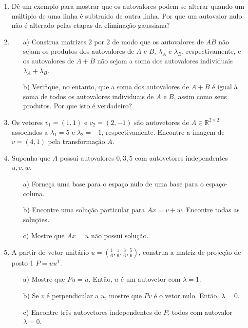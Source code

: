 \documentclass[12pt]{article}
\begin{document}
\begin{enumerate}
\item Dê um exemplo para mostrar que os autovalores podem se alterar quando um múltiplo de uma linha é subtraido de outra linha. Por que um autovalor nulo não é alterado pelas etapas da eliminação gaussiana?

\item
    \begin{itemize}
    \item[a)] Construa matrizes 2 por 2 de modo que os autovalores de $AB$ não sejam os produtos dos autovalores de $A$ e $B$, $\lambda_A$ e $\lambda_B$, respectivamente, e os autovalores de $A+B$ não sejam a soma dos autovalores individuais $\lambda_A+\lambda_B$.
    \item[b)] Verifique, no entanto, que a soma dos autovalores de $A+B$ é igual à soma de todos os autovalores individuais de $A$ e $B$, assim como seus produtos. Por que isto é verdadeiro?
    \end{itemize}

\item Os vetores $v_1=(1,1)$ e $v_2=(2,-1)$ são autovetores de $A\in {\mathbb{R}}^{2\times 2}$ associados a $\lambda_1=5$ e $\lambda_2=-1$, respectivamente. Encontre a imagem de $v=(4,1)$ pela transformação $A$.

\item Suponha que $A$ possui autovalores $0, 3, 5$ com autovetores independentes $u,v,w$.
  \begin{itemize}
  \item[a)] Forneça uma base para o espaço nulo de uma base para o espaço-coluna.
  \item[b)] Encontre uma solução particular para $Ax=v+w$. Encontre todas as soluções.
  \item[c)] Mostre que $Ax=u$ não possui solução.
  \end{itemize}

\item A partir do vetor unitário $u=(\frac{1}{6}, \frac{1}{6}, \frac{3}{6}, \frac{5}{6})$, construa a matriz de projeção de posto 1 $P=uu^T$. 
  \begin{itemize}
  \item[a)] Mostre que $Pu=u$. Então, $u$ é um autovetor com $\lambda =1$.
  \item[b)] Se $v$ é perpendicular a $u$, mostre que $Pv$ é o vetor nulo. Então, $\lambda =0$.
  \item[c)] Encontre três autovetores independentes de $P$, todos com autovalor $\lambda =0$.
  \end{itemize}


\end{enumerate}
\end{document}
